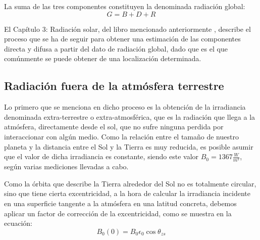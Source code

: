 La suma de las tres componentes constituyen la denominada radiación global:
\begin{equation}
G=B+D+R
\end{equation}
\label{equation:eqn_global_radiation}

El Capítulo 3: Radiación solar, del libro mencionado anteriormente \cite{esf_book}, describe el proceso que se ha de seguir para obtener una estimación de las componentes directa y difusa a partir del dato de radiación global, dado que es el que comúnmente se puede obtener de una localización determinada.

\subsection{Radiación fuera de la atmósfera terrestre}
\label{section:extra-irrad}

Lo primero que se menciona en dicho proceso es la obtención de la irradiancia denominada extra-terrestre o extra-atmosférica, que es la radiación que llega a la atmósfera, directamente desde el sol, que no sufre ninguna perdida por interaccionar con algún medio. Como la relación entre el tamaño de nuestro planeta y la distancia entre el Sol y la Tierra es muy reducida, es posible asumir que el valor de dicha irradiancia es constante, siendo este valor $B_0 = 1367 \frac{W}{m^2}$, según varias mediciones llevadas a cabo.

Como la órbita que describe la Tierra alrededor del Sol no es totalmente circular, sino que tiene cierta excentricidad, a la hora de calcular la irradiancia incidente en una superficie tangente a la atmósfera en una latitud concreta, debemos aplicar un factor de corrección de la excentricidad, como se muestra en la ecuación:\\

\begin{equation}\label{eqn:B00}
B_0(0) = B_0\epsilon_0\cos\theta_{zs}
\end{equation}\\

